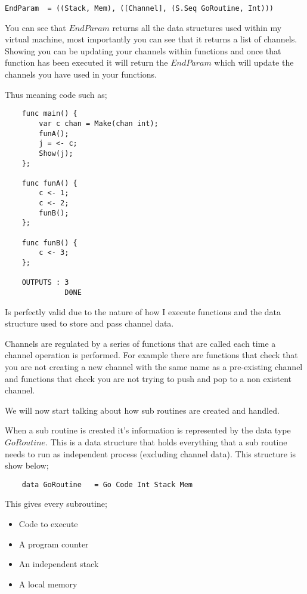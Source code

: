 \begin{lstlisting}
EndParam  = ((Stack, Mem), ([Channel], (S.Seq GoRoutine, Int))) 
\end{lstlisting}

You can see that $EndParam$ returns all the data structures used within my virtual machine, most importantly you can see that it returns a list of channels. Showing you can be updating your channels within functions and once that function has been executed it will return the $EndParam$  which will update the channels you have used in your functions.

Thus meaning code such as;

\begin{lstlisting}
	func main() {
		var c chan = Make(chan int);
		funA();
		j = <- c;
		Show(j);
	};
	
	func funA() {
		c <- 1;
		c <- 2;
		funB();
	};
	
	func funB() {
		c <- 3;
	};

	OUTPUTS : 3
	          D0NE
\end{lstlisting}

Is perfectly valid due to the nature of how I execute functions and the data structure used to store and pass channel data. 

Channels are regulated by a series of functions that are called each time a channel operation is performed. For example there are functions that check that you are not creating a new channel with the same name as a pre-existing channel and functions that check you are not trying to push and pop to a non existent channel.

We will now start talking about how sub routines are created and handled.

When a sub routine is created it's information is represented by the data type $GoRoutine$. This is a data structure that holds everything that a sub routine needs to run as independent process (excluding channel data). This structure is show below;

\begin{lstlisting}
	data GoRoutine   = Go Code Int Stack Mem  
\end{lstlisting}   

This gives every subroutine;

\begin{itemize}
\item Code to execute
\item A program counter
\item An independent stack
\item A local memory
\end{itemize}
 

